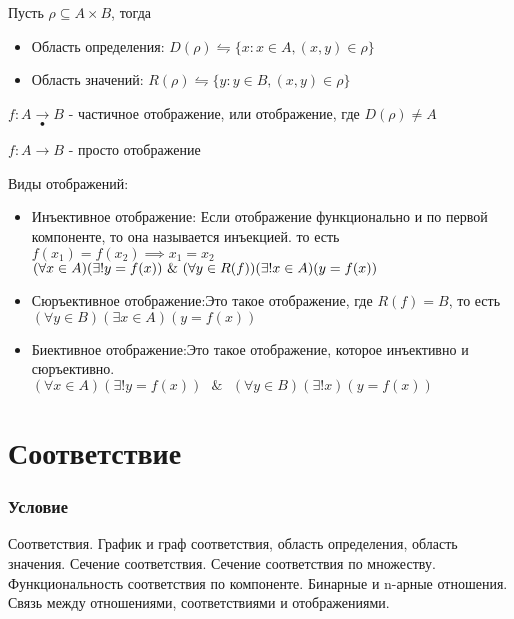 \documentclass{report}
\newcommand{\band}{\mbox{ } \& \mbox{ }}
\begin{document}
\medskip

Пусть $\rho \subseteq A \times B$, тогда
\begin{itemize}
	\item Область определения: $D(\rho) \leftrightharpoons \{x:x \in A, (x,y) \in \rho\}$
	\item Область значений: $R(\rho) \leftrightharpoons \{y:y \in B, (x,y) \in \rho\}$
\end{itemize}

$f: A \underset{\bullet}{\rightarrow} B$ - частичное отображение, или отображение, где $D(\rho) \neq A$

$f: A \rightarrow B$ - просто отображение

\medskip

Виды отображений:
\begin{itemize}
	\item Инъективное отображение:\newline
		Если отображение функционально и по первой компоненте,
		то она называется инъекцией. то есть $f(x_1) = f(x_2) \implies x_1 = x_2$\newline
	      $(\forall x \in A)(\exists!\space y = f(x)) \band (\forall y \in R(f))(\exists!\space x \in A)(y = f(x))$
	\item Сюръективное отображение:\newline Это такое отображение, где $R(f) = B$, то есть\newline
	      $(\forall y \in B)(\exists x \in A)(y = f(x))$
	\item Биективное отображение:\newline Это такое отображение, которое инъективно и сюръективно.\newline
	      $(\forall x \in A)(\exists! y = f(x)) \band (\forall y \in B)(\exists! x)(y = f(x))$
\end{itemize}
\newpage

\section{Соответствие}
\subsubsection{Условие}
Соответствия. График и граф соответствия, область определения, область значения.
Сечение соответствия. Сечение соответствия по множеству. Функциональность
соответствия по компоненте. Бинарные и n-арные отношения. Связь между
отношениями, соответствиями и отображениями.
\end{document}
